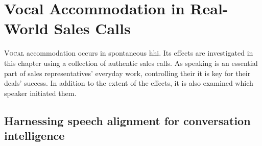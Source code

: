 \chapter{Vocal Accommodation in Real-World Sales Calls}
\label{chap:conv_analysis}

\lettrine{V}{ocal} accommodation occurs in spontaneous \acl{hhi}.
Its effects are investigated in this chapter using a collection of authentic sales calls.
As speaking is an essential part of sales representatives' everyday work, controlling their it is key for their deals' success.
In addition to the extent of the effects, it is also examined which speaker initiated them.

\pagebreak

\acresetall

\section{Harnessing speech alignment for conversation intelligence}
\label{sec:conversation_intelligence}

